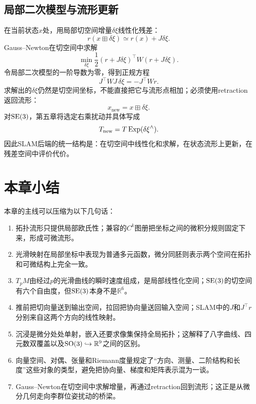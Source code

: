 \subsection{局部二次模型与流形更新}

在当前状态$x$处，用局部切空间增量$\delta\xi$线性化残差：
\[
    r(x\boxplus\delta\xi)
    \simeq r(x)+J\delta\xi.
\]
Gauss--Newton在切空间中求解
\[
    \min_{\delta\xi}
    \frac12(r+J\delta\xi)^\top W(r+J\delta\xi).
\]
令局部二次模型的一阶导数为零，得到正规方程
\[
    J^\top WJ\,\delta\xi=-J^\top Wr.
\]
求解出的$\delta\xi$仍然是切空间坐标，不能直接把它与流形点相加；必须使用retraction返回流形：
\[
    x_{\mathrm{new}}=x\boxplus\delta\xi.
\]
对$\operatorname{SE}(3)$，第五章将选定右乘扰动并具体写成
\[
    T_{\mathrm{new}}=T\operatorname{Exp}(\delta\xi^\wedge).
\]
因此SLAM后端的统一结构是：在切空间中线性化和求解，在状态流形上更新，在残差空间中评价代价。


\section*{本章小结}

本章的主线可以压缩为以下几句话：
\begin{enumerate}
    \item 拓扑流形只提供局部欧氏性；兼容的$C^k$图册把坐标之间的微积分规则固定下来，形成可微流形。
    \item 光滑映射在局部坐标中表现为普通多元函数，微分同胚则表示两个空间在拓扑和可微结构上完全一致。
    \item $T_pM$由经过$p$的光滑曲线的瞬时速度组成，是局部线性化空间；$\operatorname{SE}(3)$的切空间有六个自由度，但$\operatorname{SE}(3)$本身不是$\mathbb R^6$。
    \item 推前把切向量送到输出空间，拉回把协向量送回输入空间；SLAM中的$J$和$J^\top r$分别来自这两个方向的线性映射。
    \item 沉浸是微分处处单射，嵌入还要求像集保持全局拓扑；这解释了八字曲线、四元数双覆盖以及$\operatorname{SO}(3)\hookrightarrow\mathbb R^9$之间的区别。
    \item 向量空间、对偶、张量和Riemann度量规定了“方向、测量、二阶结构和长度”这些对象的类型，避免把协向量、梯度和矩阵表示混为一谈。
    \item Gauss--Newton在切空间中求解增量，再通过retraction回到流形；这正是从微分几何走向李群位姿扰动的桥梁。
\end{enumerate}
